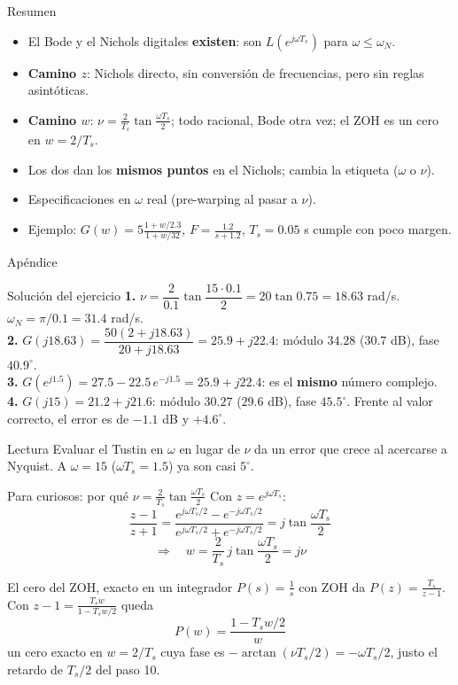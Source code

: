 \documentclass[aspectratio=169,11pt]{beamer}
\begin{document}
\begin{frame}{Resumen}
  \small
  \begin{itemize}
    \item El Bode y el Nichols digitales \textbf{existen}: son $L(e^{j\omega T_s})$ para $\omega\le\omega_N$.
    \item \textbf{Camino $z$}: Nichols directo, sin conversión de frecuencias, pero sin reglas asintóticas.
    \item \textbf{Camino $w$}: $\nu=\frac{2}{T_s}\tan\frac{\omega T_s}{2}$; todo racional, Bode otra vez; el ZOH es un cero en $w=2/T_s$.
    \item Los dos dan los \textbf{mismos puntos} en el Nichols; cambia la etiqueta ($\omega$ o $\nu$).
    \item Especificaciones en $\omega$ real (pre-warping al pasar a $\nu$).
    \item Ejemplo: $G(w)=5\frac{1+w/2.3}{1+w/32}$, $F=\frac{1.2}{s+1.2}$, $T_s=0.05$ s cumple con poco margen.
  \end{itemize}
\end{frame}

\appendix
\begin{frame}\centering\Large Apéndice\end{frame}

\begin{frame}{Solución del ejercicio}
  \footnotesize
  \textbf{1.} $\nu=\dfrac{2}{0.1}\tan\dfrac{15\cdot0.1}{2}=20\tan0.75=18.63$ rad/s. $\omega_N=\pi/0.1=31.4$ rad/s.\\[3pt]
  \textbf{2.} $G(j18.63)=\dfrac{50(2+j18.63)}{20+j18.63}=25.9+j22.4$: módulo $34.28$ ($30.7$ dB), fase $40.9^\circ$.\\[3pt]
  \textbf{3.} $G(e^{j1.5})=27.5-22.5\,e^{-j1.5}=25.9+j22.4$: es el \textbf{mismo} número complejo.\\[3pt]
  \textbf{4.} $G(j15)=21.2+j21.6$: módulo $30.27$ ($29.6$ dB), fase $45.5^\circ$. Frente al valor correcto, el error es de $-1.1$ dB y $+4.6^\circ$.
  \begin{block}{Lectura}
    Evaluar el Tustin en $\omega$ en lugar de $\nu$ da un error que crece al acercarse a Nyquist. A $\omega=15$ ($\omega T_s=1.5$) ya son casi $5^\circ$.
  \end{block}
\end{frame}

\begin{frame}{Para curiosos: por qué $\nu=\frac{2}{T_s}\tan\frac{\omega T_s}{2}$}
  \small
  Con $z=e^{j\omega T_s}$:
  \[ \frac{z-1}{z+1}=\frac{e^{j\omega T_s/2}-e^{-j\omega T_s/2}}{e^{j\omega T_s/2}+e^{-j\omega T_s/2}}=j\tan\frac{\omega T_s}{2} \]
  \[ \Rightarrow\quad w=\frac{2}{T_s}\,j\tan\frac{\omega T_s}{2}=j\nu \]
  \begin{block}{El cero del ZOH, exacto en un integrador}
    $P(s)=\frac{1}{s}$ con ZOH da $P(z)=\frac{T_s}{z-1}$. Con $z-1=\frac{T_sw}{1-T_sw/2}$ queda
    \[ P(w)=\frac{1-T_sw/2}{w} \]
    un cero exacto en $w=2/T_s$ cuya fase es $-\arctan(\nu T_s/2)=-\omega T_s/2$, justo el retardo de $T_s/2$ del paso 10.
  \end{block}
\end{frame}
\end{document}
